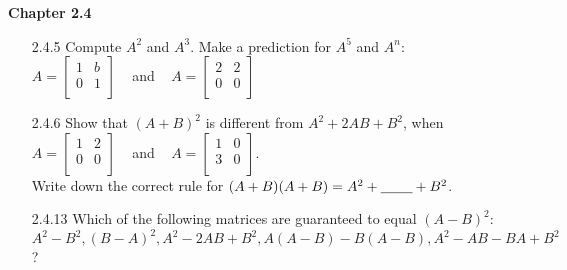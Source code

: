 \documentclass[10pt,twoside,reqno]{article}
\begin{document}
\vspace{5mm}
\textbf{Chapter 2.4}
\begin{enumerate}
\item[2.4.5]Compute $A^2$ and $A^3$. Make a prediction for $A^5$ and $A^n$: \\
\vspace{3mm}
\hspace{130pt}
$
$$
A=
\begin{bmatrix}
1&b \\
0&1 \\
\end{bmatrix}
\hspace{10pt}
$$
$
and
$
$$
\hspace{10pt}
A=
\begin{bmatrix}
2&2 \\
0&0 \\
\end{bmatrix}
$$
$\\
\vspace{3mm}
\item[2.4.6]Show that $(A + B)^2$ is different from $A^2 + 2AB + B^2$, when \\
\vspace{3mm}
\hspace{130pt}
$
$$
A=
\begin{bmatrix}
1&2 \\
0&0 \\
\end{bmatrix}
\hspace{10pt}
$$
$
and
$
$$
\hspace{10pt}
A=
\begin{bmatrix}
1&0 \\
3&0 \\
\end{bmatrix}
$$
$.\\
\vspace{3mm} 
Write down the correct rule for $(A + B)(A + B) = A^2 + \underline{\hspace{8mm}} + B^2$.
\vspace{3mm}
\item[2.4.13]Which of the following matrices are guaranteed to equal $(A - B)^2$:\hspace{15pt}$A^2 - B^2, (B - A)^2, A^2 - 2AB + B^2, A(A - B) - B(A - B), A^2 - AB - BA + B^2$? 
\vspace{3mm}

\end{enumerate}
\end{document}
